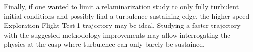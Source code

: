 Finally, if one wanted to limit a relaminarization study to only fully turbulent
initial conditions and possibly find a turbulence-sustaining edge, the higher
speed Exploration Flight Test-1 trajectory may be ideal.  Studying a faster
trajectory with the suggested methodology improvements may allow interrogating
the physics at the cusp where turbulence can only barely be sustained.
